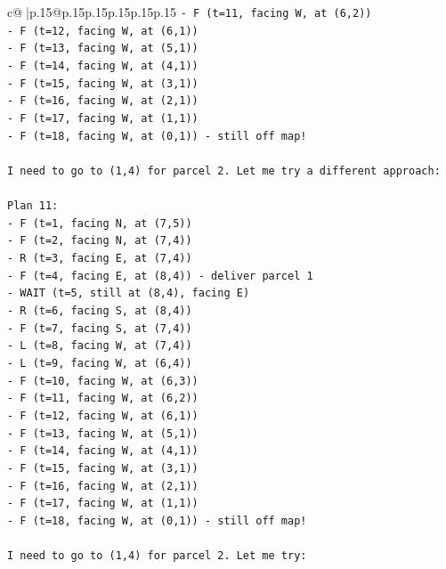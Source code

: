 \documentclass{article}
\begin{document}
{\begin{supertabular}{c@{$\;$}|p{.15\linewidth}@{}p{.15\linewidth}p{.15\linewidth}p{.15\linewidth}p{.15\linewidth}p{.15\linewidth}}
{{{\texttt{{-} F (t=11, facing W, at (6,2))} \\
\texttt{{-} F (t=12, facing W, at (6,1))} \\
\texttt{{-} F (t=13, facing W, at (5,1))} \\
\texttt{{-} F (t=14, facing W, at (4,1))} \\
\texttt{{-} F (t=15, facing W, at (3,1))} \\
\texttt{{-} F (t=16, facing W, at (2,1))} \\
\texttt{{-} F (t=17, facing W, at (1,1))} \\
\texttt{{-} F (t=18, facing W, at (0,1)) {-} still off map!} \\
\\ 
\texttt{I need to go to (1,4) for parcel 2. Let me try a different approach:} \\
\\ 
\texttt{Plan 11:} \\
\texttt{{-} F (t=1, facing N, at (7,5))} \\
\texttt{{-} F (t=2, facing N, at (7,4))} \\
\texttt{{-} R (t=3, facing E, at (7,4))} \\
\texttt{{-} F (t=4, facing E, at (8,4)) {-} deliver parcel 1} \\
\texttt{{-} WAIT (t=5, still at (8,4), facing E)} \\
\texttt{{-} R (t=6, facing S, at (8,4))} \\
\texttt{{-} F (t=7, facing S, at (7,4))} \\
\texttt{{-} L (t=8, facing W, at (7,4))} \\
\texttt{{-} L (t=9, facing W, at (6,4))} \\
\texttt{{-} F (t=10, facing W, at (6,3))} \\
\texttt{{-} F (t=11, facing W, at (6,2))} \\
\texttt{{-} F (t=12, facing W, at (6,1))} \\
\texttt{{-} F (t=13, facing W, at (5,1))} \\
\texttt{{-} F (t=14, facing W, at (4,1))} \\
\texttt{{-} F (t=15, facing W, at (3,1))} \\
\texttt{{-} F (t=16, facing W, at (2,1))} \\
\texttt{{-} F (t=17, facing W, at (1,1))} \\
\texttt{{-} F (t=18, facing W, at (0,1)) {-} still off map!} \\
\\ 
\texttt{I need to go to (1,4) for parcel 2. Let me try:} \\
}}}
\end{supertabular}}
\end{document}
